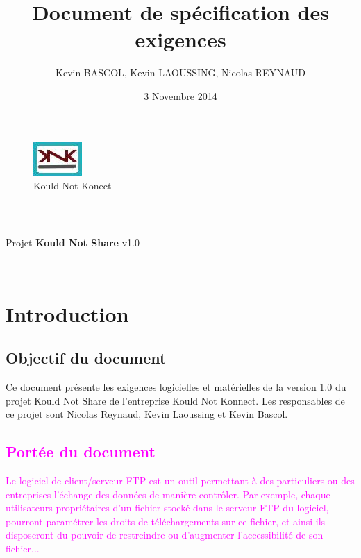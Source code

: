 \documentclass[10pt,a4paper]{report}
\author{Kevin BASCOL, Kevin LAOUSSING, Nicolas REYNAUD}
\title{Document de spécification des exigences}
\date{3 Novembre 2014}
\begin{document}
\makeatletter
	\begin{titlepage}
	
	\begin{figure}
		\begin{minipage}[c]{.46\linewidth}
		\end{minipage} \hfill
		\begin{minipage}[c]{.20\linewidth}
			\begin{center}
				\includegraphics{../Logo/logoKNK.jpg}\\
				{\large Kould Not Konect}
			\end{center}
		\end{minipage}
	\vspace{1cm}
	\end{figure}
	
	\centering
		{\Huge \textbf{\@title}}\\
		\hrule height 4pt
		\vspace{1.5cm}
		{\LARGE  Projet \textbf{Kould Not Share} v1.0}
		
		\vfill
		
		\@author\\
		\@date 
		\end{titlepage}
\makeatother
\setcounter{secnumdepth}{4}
\setcounter{tocdepth}{4}
\renewcommand{\contentsname}{Sommaire}
\tableofcontents
\thispagestyle{empty}
\setcounter{page}{0}
\newpage


\section{Introduction}

\subsection{Objectif du document}
Ce document présente les exigences logicielles et matérielles de la version 1.0 du projet Kould Not Share de l'entreprise Kould Not Konnect. Les responsables de ce projet sont Nicolas Reynaud, Kevin Laoussing et Kevin Bascol.

\textcolor{magenta}{\subsection{Portée du document}
Le logiciel de client/serveur FTP est un outil permettant à des particuliers ou des entreprises l'échange des données de manière contrôler. Par exemple, chaque utilisateurs propriétaires d'un fichier stocké dans le serveur FTP du logiciel, pourront paramétrer les droits de téléchargements sur ce fichier, et ainsi ils disposeront du pouvoir de restreindre ou d'augmenter l'accessibilité de son fichier...
}
\end{document}
